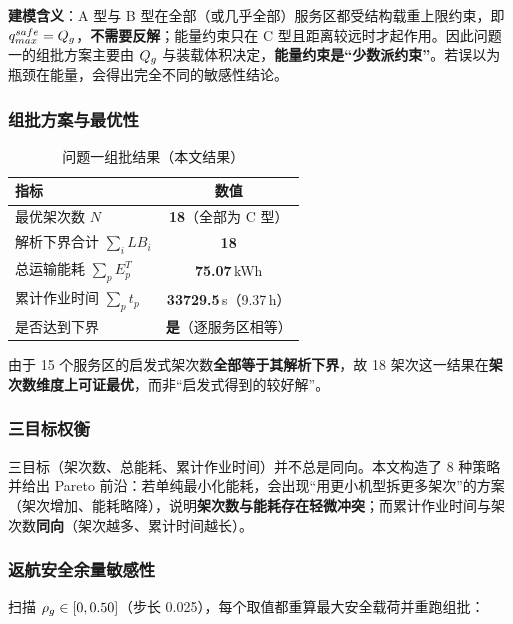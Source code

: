 \textbf{建模含义}：A 型与 B 型在全部（或几乎全部）服务区都受结构载重上限约束，即 $q_{max}^{safe}=Q_{g}$，\textbf{不需要反解}；能量约束只在 C 型且距离较远时才起作用。因此问题一的组批方案主要由 $Q_{g}$ 与装载体积决定，\textbf{能量约束是“少数派约束”}。若误以为瓶颈在能量，会得出完全不同的敏感性结论。

\subsubsection{组批方案与最优性}

\begin{table}[htbp]
	\caption{问题一组批结果（本文结果）}
	\label{tab:q1result}
	\centering
	\begin{tabular}{lc}
		\toprule
		指标 & 数值 \\
		\midrule
		最优架次数 $N$            & \textbf{18}（全部为 C 型） \\
		解析下界合计 $\sum_i LB_i$ & \textbf{18} \\
		总运输能耗 $\sum_p E_p^{T}$ & \textbf{75.07}\,kWh \\
		累计作业时间 $\sum_p t_p$   & \textbf{33729.5}\,s（9.37\,h） \\
		是否达到下界               & \textbf{是}（逐服务区相等） \\
		\bottomrule
	\end{tabular}
\end{table}

由于 15 个服务区的启发式架次数\textbf{全部等于其解析下界}，故 18 架次这一结果在\textbf{架次数维度上可证最优}，而非“启发式得到的较好解”。

\subsubsection{三目标权衡}

三目标（架次数、总能耗、累计作业时间）并不总是同向。本文构造了 8 种策略并给出 Pareto 前沿：若单纯最小化能耗，会出现“用更小机型拆更多架次”的方案（架次增加、能耗略降），说明\textbf{架次数与能耗存在轻微冲突}；而累计作业时间与架次数\textbf{同向}（架次越多、累计时间越长）。

\subsubsection{返航安全余量敏感性}

扫描 $\rho_{g}\in[0,0.50]$（步长 0.025），每个取值都重算最大安全载荷并重跑组批：

